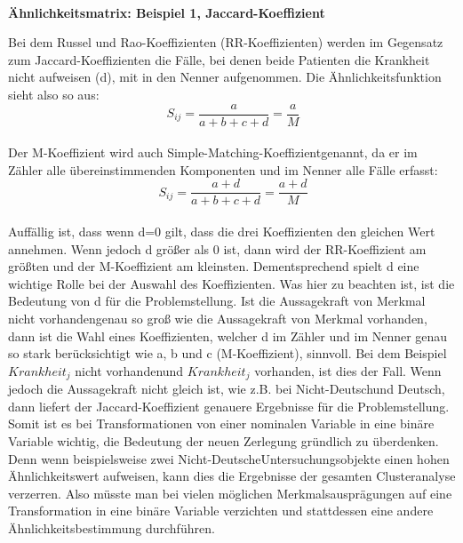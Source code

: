 \documentclass[12pt,titlepage]{article}
\begin{document}
\centerline{ \\
}
\centerline{\textbf{Ähnlichkeitsmatrix: Beispiel 1, Jaccard-Koeffizient}}
\centerline{}
Bei dem Russel und Rao-Koeffizienten (RR-Koeffizienten) werden im Gegensatz zum Jaccard-Koeffizienten die Fälle, bei denen beide Patienten die Krankheit nicht aufweisen (d), mit in den Nenner aufgenommen. Die Ähnlichkeitsfunktion sieht also so aus: \\
 \begin{equation}
  \ S_{ij}=\frac{a}{a+b+c+d}=\frac{a}{M}
 \end{equation} \\
Der M-Koeffizient wird auch \glqq Simple-Matching-Koeffizient\grqq  genannt, da er im Zähler alle übereinstimmenden Komponenten und im Nenner alle Fälle erfasst:
 \begin{equation}
  \ S_{ij}=\frac{a+d}{a+b+c+d}=\frac{a+d}{M}
 \end{equation} \\
Auffällig ist, dass wenn d=0 gilt, dass die drei Koeffizienten den gleichen Wert annehmen. Wenn jedoch d größer als 0 ist, dann wird der RR-Koeffizient am größten und der M-Koeffizient am kleinsten. Dementsprechend spielt d eine wichtige Rolle bei der Auswahl des Koeffizienten. Was hier zu beachten ist, ist die Bedeutung von d für die Problemstellung. Ist die Aussagekraft von \glqq Merkmal nicht vorhanden\grqq  genau so groß wie die Aussagekraft von \glqq Merkmal vorhanden\grqq, dann ist die Wahl eines Koeffizienten, welcher d im Zähler und im Nenner genau so stark berücksichtigt wie a, b und c (M-Koeffizient), sinnvoll. Bei dem Beispiel \glqq $Krankheit_j$ nicht vorhanden\grqq  und \glqq $Krankheit_j$ vorhanden\grqq, ist dies der Fall. Wenn jedoch die Aussagekraft nicht gleich ist, wie z.B. bei \glqq Nicht-Deutsch\grqq  und \glqq Deutsch\grqq, dann liefert der Jaccard-Koeffizient genauere Ergebnisse für die Problemstellung. \\
Somit ist es bei Transformationen von einer nominalen Variable in eine binäre Variable wichtig, die Bedeutung der neuen Zerlegung gründlich zu überdenken. Denn wenn beispielsweise zwei \glqq Nicht-Deutsche\grqq  Untersuchungsobjekte einen hohen Ähnlichkeitswert aufweisen, kann dies die Ergebnisse der gesamten Clusteranalyse verzerren. Also müsste man bei vielen möglichen Merkmalsausprägungen auf eine Transformation in eine binäre Variable verzichten und stattdessen eine andere Ähnlichkeitsbestimmung durchführen.
\end{document}
